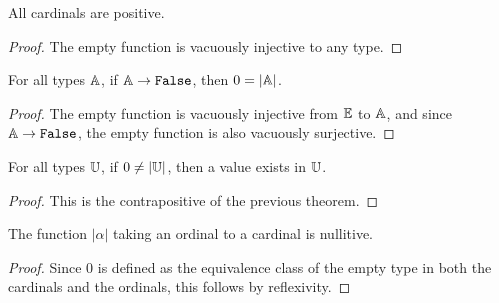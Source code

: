 \documentclass[../../math.tex]{subfiles}
\begin{document}
\begin{instance}
    All cardinals are positive.
\end{instance}
\begin{proof}
    The empty function is vacuously injective to any type.
\end{proof}

\begin{theorem} \label{card_false_0}
    For all types $\mathbb{A}$, if $\A \to \False$, then $0 = |\mathbb{A}|$.
\end{theorem}
\begin{proof}
    The empty function is vacuously injective from $\mathbb{E}$ to $\mathbb{A}$, and since $\A
    \to \False$, the empty function is also vacuously surjective.
\end{proof}

\begin{theorem} \label{card_nz_ex}
    For all types $\mathbb{U}$, if $0 \neq |\mathbb{U}|$, then a value exists in $\mathbb{U}$.
\end{theorem}
\begin{proof}
    This is the contrapositive of the previous theorem.
\end{proof}

\begin{instance}
    The function $|\alpha|$ taking an ordinal to a cardinal is nullitive.
\end{instance}
\begin{proof}
    Since $0$ is defined as the equivalence class of the empty type in both the
    cardinals and the ordinals, this follows by reflexivity.
\end{proof}
\end{document}
